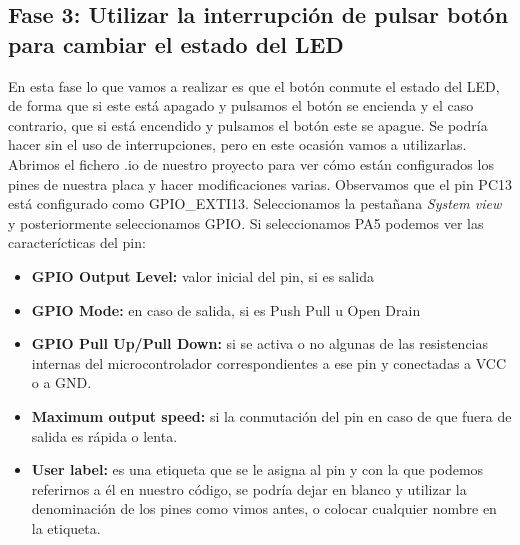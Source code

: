 \documentclass[11pt,a4paper]{article}
\begin{document}
	\subsection{Fase 3: Utilizar la interrupción de pulsar botón para cambiar el estado del LED}
	En esta fase lo que vamos a realizar es que el botón conmute el estado del LED, de forma que si este está apagado y pulsamos el botón se encienda y el caso contrario, que si está encendido y pulsamos el botón este se apague. Se podría hacer sin el uso de interrupciones, pero en este ocasión vamos a utilizarlas.\\
	
	Abrimos el fichero .io de nuestro proyecto para ver cómo están configurados los pines de nuestra placa y hacer modificaciones varias. Observamos que el pin PC13 está configurado como GPIO\_EXTI13. Seleccionamos la pestañana \textit{System view} y posteriormente seleccionamos GPIO. Si seleccionamos PA5 podemos ver las caracterícticas del pin:
	\begin{itemize}
		\item \textbf{GPIO Output Level:} valor inicial del pin, si es salida
		\item \textbf{GPIO Mode:} en caso de salida, si es Push Pull u Open Drain
		\item \textbf{GPIO Pull Up/Pull Down:} si se activa o no algunas de las resistencias internas del microcontrolador
		correspondientes a ese pin y conectadas a VCC o a GND.
		\item \textbf{Maximum output speed:} si la conmutación del pin en caso de que fuera de salida es rápida o lenta.
		\item \textbf{User label:}  es una etiqueta que se le asigna al pin y con la que podemos referirnos a él en nuestro código, se
		podría dejar en blanco y utilizar la denominación de los pines como vimos antes, o colocar cualquier nombre en la
		etiqueta.\\
	\end{itemize}
	
\end{document}
